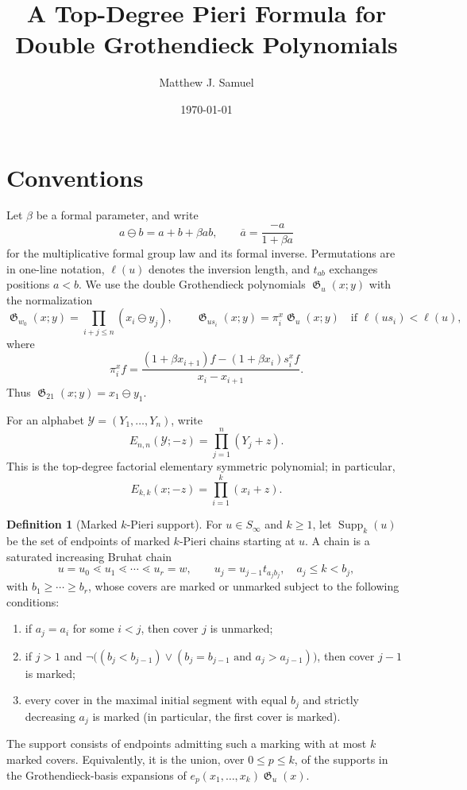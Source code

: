 \documentclass{amsart}
\title{A Top-Degree Pieri Formula for Double Grothendieck Polynomials}
\author{Matthew J. Samuel}
\date{\today}
\theoremstyle{definition}
\newtheorem{definition}[theorem]{Definition}
\theoremstyle{remark}
\DeclareMathOperator{\groth}{\mathfrak{G}}
\DeclareMathOperator{\Supp}{Supp}
\newcommand{\fgn}{\ominus}
\begin{document}
\maketitle

\section{Conventions}

Let $\beta$ be a formal parameter, and write
\[
a\fgn b = a+b+\beta ab,
\qquad
\overline{a}=\frac{-a}{1+\beta a}
\]
for the multiplicative formal group law and its formal inverse. Permutations are in
one-line notation, $\ell(u)$ denotes the inversion length, and $t_{ab}$ exchanges
positions $a<b$. We use the double Grothendieck polynomials $\groth_u(x;y)$ with
the normalization
\[
\groth_{w_0}(x;y)=\prod_{i+j\le n}(x_i\fgn y_j),
\qquad
\groth_{us_i}(x;y)=\pi_i^x\groth_u(x;y)
\quad\text{if }\ell(us_i)<\ell(u),
\]
where
\[
\pi_i^x f=\frac{(1+\beta x_{i+1})f-(1+\beta x_i)s_i^x f}{x_i-x_{i+1}}.
\]
Thus $\groth_{21}(x;y)=x_1\fgn y_1$.

For an alphabet $\mathcal{Y}=(Y_1,\ldots,Y_n)$, write
\[
E_{n,n}(\mathcal{Y};-z)=\prod_{j=1}^n(Y_j+z).
\]
This is the top-degree factorial elementary symmetric polynomial; in particular,
\[
E_{k,k}(x;-z)=\prod_{i=1}^k(x_i+z).
\]

\begin{definition}[Marked $k$-Pieri support]
For $u\in S_\infty$ and $k\ge 1$, let $\Supp_k(u)$ be the set of endpoints of
marked $k$-Pieri chains starting at $u$. A chain is a saturated increasing
Bruhat chain
\[
u=u_0\lessdot u_1\lessdot\cdots\lessdot u_r=w,
\qquad
u_j=u_{j-1}t_{a_jb_j},\quad a_j\le k<b_j,
\]
with $b_1\ge\cdots\ge b_r$, whose covers are marked or unmarked subject to the
following conditions:
\begin{enumerate}
\item if $a_j=a_i$ for some $i<j$, then cover $j$ is unmarked;
\item if $j>1$ and
$\neg\bigl((b_j<b_{j-1})\lor(b_j=b_{j-1}\text{ and }a_j>a_{j-1})\bigr)$,
then cover $j-1$ is marked;
\item every cover in the maximal initial segment with equal $b_j$ and strictly
decreasing $a_j$ is marked (in particular, the first cover is marked).
\end{enumerate}
The support consists of endpoints admitting such a marking with at most $k$
marked covers. Equivalently, it is the union, over $0\le p\le k$, of the
supports in the Grothendieck-basis expansions of
$e_p(x_1,\ldots,x_k)\groth_u(x)$.
\end{definition}
\end{document}
